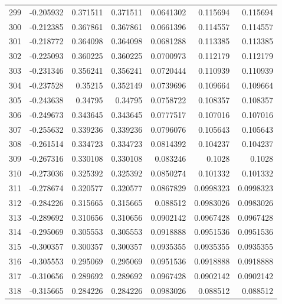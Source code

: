 \begin{tabular}{rrrrrrr}
 299 & -0.205932    & 0.371511    & 0.371511    &  0.0641302   & 0.115694    & 0.115694    \\
 300 & -0.212385    & 0.367861    & 0.367861    &  0.0661396   & 0.114557    & 0.114557    \\
 301 & -0.218772    & 0.364098    & 0.364098    &  0.0681288   & 0.113385    & 0.113385    \\
 302 & -0.225093    & 0.360225    & 0.360225    &  0.0700973   & 0.112179    & 0.112179    \\
 303 & -0.231346    & 0.356241    & 0.356241    &  0.0720444   & 0.110939    & 0.110939    \\
 304 & -0.237528    & 0.35215     & 0.352149    &  0.0739696   & 0.109664    & 0.109664    \\
 305 & -0.243638    & 0.34795     & 0.34795     &  0.0758722   & 0.108357    & 0.108357    \\
 306 & -0.249673    & 0.343645    & 0.343645    &  0.0777517   & 0.107016    & 0.107016    \\
 307 & -0.255632    & 0.339236    & 0.339236    &  0.0796076   & 0.105643    & 0.105643    \\
 308 & -0.261514    & 0.334723    & 0.334723    &  0.0814392   & 0.104237    & 0.104237    \\
 309 & -0.267316    & 0.330108    & 0.330108    &  0.083246    & 0.1028      & 0.1028      \\
 310 & -0.273036    & 0.325392    & 0.325392    &  0.0850274   & 0.101332    & 0.101332    \\
 311 & -0.278674    & 0.320577    & 0.320577    &  0.0867829   & 0.0998323   & 0.0998323   \\
 312 & -0.284226    & 0.315665    & 0.315665    &  0.088512    & 0.0983026   & 0.0983026   \\
 313 & -0.289692    & 0.310656    & 0.310656    &  0.0902142   & 0.0967428   & 0.0967428   \\
 314 & -0.295069    & 0.305553    & 0.305553    &  0.0918888   & 0.0951536   & 0.0951536   \\
 315 & -0.300357    & 0.300357    & 0.300357    &  0.0935355   & 0.0935355   & 0.0935355   \\
 316 & -0.305553    & 0.295069    & 0.295069    &  0.0951536   & 0.0918888   & 0.0918888   \\
 317 & -0.310656    & 0.289692    & 0.289692    &  0.0967428   & 0.0902142   & 0.0902142   \\
 318 & -0.315665    & 0.284226    & 0.284226    &  0.0983026   & 0.088512    & 0.088512    \\

\end{tabular}
